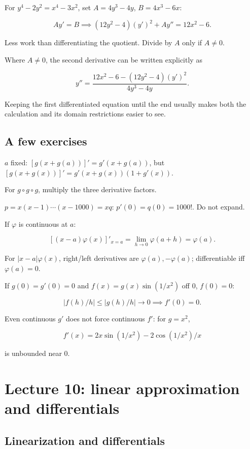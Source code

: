 \documentclass[11pt,a4paper]{article}
\begin{document}
For \(y^4-2y^2=x^4-3x^2\), set \(A=4y^3-4y\), \(B=4x^3-6x\):

\[
Ay'=B\implies(12y^2-4)(y')^2+Ay''=12x^2-6.
\]

Less work than differentiating the quotient. Divide by \(A\) only if
\(A\ne0\).

Where \(A\ne0\), the second derivative can be written explicitly as

\[
y''=\frac{12x^2-6-(12y^2-4)(y')^2}{4y^3-4y}.
\]

Keeping the first differentiated equation until the end usually makes
both the calculation and its domain restrictions easier to see.

\subsection{A few exercises}\label{a-few-exercises}

\(a\) fixed: \([g(x+g(a))]'=g'(x+g(a))\), but
\([g(x+g(x))]'=g'(x+g(x))(1+g'(x))\).

For \(g\circ g\circ g\), multiply the three derivative factors.

\(p=x(x-1)\cdots(x-1000)=xq\): \(p'(0)=q(0)=1000!\). Do not expand.

If \(\varphi\) is continuous at \(a\):

\[
[(x-a)\varphi(x)]'_{x=a}=\lim_{h\to0}\varphi(a+h)=\varphi(a).
\]

For \(|x-a|\varphi(x)\), right/left derivatives are
\(\varphi(a),-\varphi(a)\); differentiable iff \(\varphi(a)=0\).

If \(g(0)=g'(0)=0\) and \(f(x)=g(x)\sin(1/x^2)\) off \(0\), \(f(0)=0\):

\[
|f(h)/h|\le|g(h)/h|\to0\implies f'(0)=0.
\]

Even continuous \(g'\) does not force continuous \(f'\): for \(g=x^2\),

\[
f'(x)=2x\sin(1/x^2)-2\cos(1/x^2)/x
\]

is unbounded near \(0\).

\section{Lecture 10: linear approximation and
differentials}\label{lecture-10-linear-approximation-and-differentials}

\subsection{Linearization and
differentials}\label{linearization-and-differentials}
\end{document}

